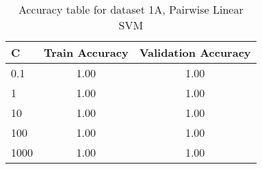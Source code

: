 \def\arraystretch{1.25}
\begin{table}[H]
\centering
\begin{tabular}{l c c}
\hline
\hline
\textbf{C} & \textbf{Train Accuracy} & \textbf{Validation Accuracy} \\
\hline
\hline
0.1 & 1.00 & 1.00\\
1 & 1.00 & 1.00\\
10 & 1.00 & 1.00\\
100 & 1.00 & 1.00\\
1000 & 1.00 & 1.00\\
\hline
\end{tabular}
\caption{Accuracy table for dataset 1A, Pairwise Linear SVM}
\end{table}